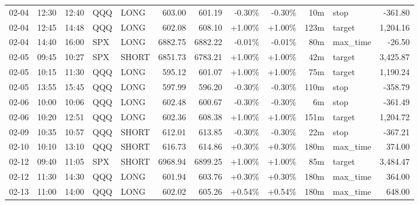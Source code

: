 \documentclass[11pt,a4paper]{article}
\begin{document}
\begin{center}
\begin{longtable}{>{\color{txtmain}}l l l l l r r r r r >{\color{txtmain}}l r}
02-04 & 12:30 & 12:40 & QQQ & LONG & 603.00 & 601.19 & \textcolor{lossred}{-0.30\%} & \textcolor{lossred}{-0.30\%} & 10m & stop & \textcolor{lossred}{-361.80} \\
02-04 & 12:45 & 14:48 & QQQ & LONG & 602.08 & 608.10 & \textcolor{wingreen}{+1.00\%} & \textcolor{wingreen}{+1.00\%} & 123m & target & \textcolor{wingreen}{1,204.16} \\
02-04 & 14:40 & 16:00 & SPX & LONG & 6882.75 & 6882.22 & \textcolor{lossred}{-0.01\%} & \textcolor{lossred}{-0.01\%} & 80m & max\_time & \textcolor{lossred}{-26.50} \\
02-05 & 09:45 & 10:27 & SPX & SHORT & 6851.73 & 6783.21 & \textcolor{wingreen}{+1.00\%} & \textcolor{wingreen}{+1.00\%} & 42m & target & \textcolor{wingreen}{3,425.87} \\
02-05 & 10:15 & 11:30 & QQQ & LONG & 595.12 & 601.07 & \textcolor{wingreen}{+1.00\%} & \textcolor{wingreen}{+1.00\%} & 75m & target & \textcolor{wingreen}{1,190.24} \\
02-05 & 13:55 & 15:45 & QQQ & LONG & 597.99 & 596.20 & \textcolor{lossred}{-0.30\%} & \textcolor{lossred}{-0.30\%} & 110m & stop & \textcolor{lossred}{-358.79} \\
02-06 & 10:00 & 10:06 & QQQ & LONG & 602.48 & 600.67 & \textcolor{lossred}{-0.30\%} & \textcolor{lossred}{-0.30\%} & 6m & stop & \textcolor{lossred}{-361.49} \\
02-06 & 10:20 & 12:51 & QQQ & LONG & 602.36 & 608.38 & \textcolor{wingreen}{+1.00\%} & \textcolor{wingreen}{+1.00\%} & 151m & target & \textcolor{wingreen}{1,204.72} \\
02-09 & 10:35 & 10:57 & QQQ & SHORT & 612.01 & 613.85 & \textcolor{lossred}{-0.30\%} & \textcolor{lossred}{-0.30\%} & 22m & stop & \textcolor{lossred}{-367.21} \\
02-10 & 10:10 & 13:10 & QQQ & SHORT & 616.73 & 614.86 & \textcolor{wingreen}{+0.30\%} & \textcolor{wingreen}{+0.30\%} & 180m & max\_time & \textcolor{wingreen}{374.00} \\
02-12 & 09:40 & 11:05 & SPX & SHORT & 6968.94 & 6899.25 & \textcolor{wingreen}{+1.00\%} & \textcolor{wingreen}{+1.00\%} & 85m & target & \textcolor{wingreen}{3,484.47} \\
02-12 & 11:30 & 14:30 & QQQ & LONG & 601.94 & 603.76 & \textcolor{wingreen}{+0.30\%} & \textcolor{wingreen}{+0.30\%} & 180m & max\_time & \textcolor{wingreen}{364.00} \\
02-13 & 11:00 & 14:00 & QQQ & LONG & 602.02 & 605.26 & \textcolor{wingreen}{+0.54\%} & \textcolor{wingreen}{+0.54\%} & 180m & max\_time & \textcolor{wingreen}{648.00} \\

\end{longtable}
\end{center}
\end{document}

